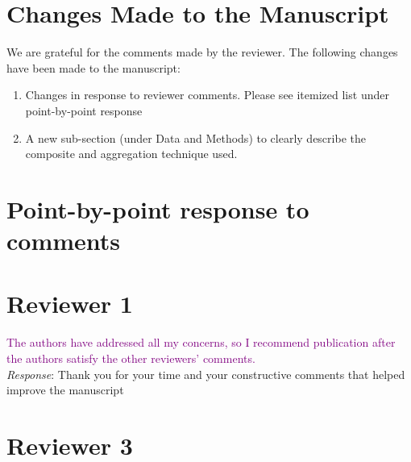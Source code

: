 \documentclass[10pt, letterpaper]{article}
\begin{document}

\section*{Changes Made to the Manuscript}

We are grateful for the comments made by the reviewer. The following changes have been made to the manuscript:

\begin{enumerate}
    \item Changes in response to reviewer comments. Please see itemized list under point-by-point response

    \item A new sub-section (under Data and Methods) to clearly describe the composite and aggregation technique used.

\end{enumerate}

\vspace{.25in}

\section*{Point-by-point response to comments}


\section{Reviewer 1}

\textcolor{purple}{The authors have addressed all my concerns, so I recommend publication after the authors satisfy the other reviewers' comments.} \\

{\emph{Response}: Thank you for your time and your constructive comments that helped improve the manuscript}


\vspace{.25in}



\section{Reviewer 3}
\end{document}
